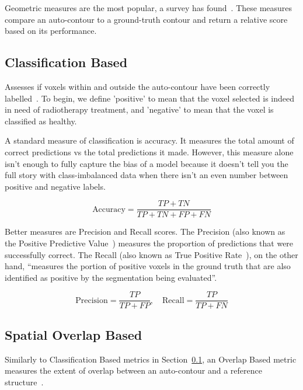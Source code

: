 \documentclass[12pt,twoside]{report}
\begin{document}
Geometric measures are the most popular, a survey has found~\cite{review-metrics}. These measures compare an auto-contour to a ground-truth contour and return a relative score based on its performance.

\subsection{Classification Based}\label{sect:classification-based}

Assesses if voxels within and outside the auto-contour have been correctly labelled~\cite{review-metrics}. To begin, we define 'positive' to mean that the voxel selected is indeed in need of radiotherapy treatment, and 'negative' to mean that the voxel is classified as healthy.

A standard measure of classification is accuracy. It measures the total amount of correct predictions vs the total predictions it made. However, this measure alone isn't enough to fully capture the bias of a model because it doesn't tell you the full story with class-imbalanced data when there isn't an even number between positive and negative labels.

\begin{equation*}
  \text{Accuracy} = \frac{TP + TN}{TP + TN + FP + FN}
\end{equation*}

Better measures are Precision and Recall scores. The Precision (also known as the Positive Predictive Value~\cite{evaluation-metrics}) measures the proportion of predictions that were successfully correct. The Recall (also known as True Positive Rate~\cite{evaluation-metrics}), on the other hand, ``measures the portion of positive voxels in the ground truth that are also identified as positive by the segmentation being evaluated''.

\begin{equation*}
  \text{Precision} = \frac{TP}{TP+FP}, \quad \text{Recall} = \frac{TP}{TP+FN}
\end{equation*}

\subsection{Spatial Overlap Based}\label{sect:spatial-overlap-based}

Similarly to Classification Based metrics in Section~\ref{sect:classification-based}, an Overlap Based metric measures the extent of overlap between an auto-contour and a reference structure~\cite{review-metrics}.
\end{document}
